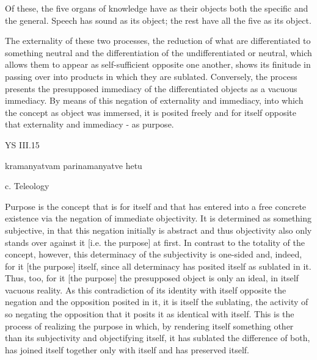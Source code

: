 Of these, the five organs of knowledge have as their objects
both the specific and the general.
Speech has sound as its object;
the rest have all the five as its object.

The externality of these two processes,
the reduction of what are differentiated to something neutral and
the differentiation of the undifferentiated or neutral,
which allows them to appear as self-sufficient opposite one another,
shows its finitude in passing over into products in which they are sublated.
Conversely, the process presents the presupposed immediacy
of the differentiated objects as a vacuous immediacy.
By means of this negation of externality and immediacy,
into which the concept as object was immersed,
it is posited freely and for itself opposite
that externality and immediacy - as purpose.

YS III.15

kramanyatvam parinamanyatve hetu

c. Teleology

Purpose is the concept that is for itself and that has entered into
a free concrete existence via the negation of immediate objectivity.
It is determined as something subjective, in that this negation
initially is abstract and thus objectivity also only stands
over against it [i.e. the purpose] at first.
In contrast to the totality of the concept, however,
this determinacy of the subjectivity is one-sided and, indeed,
for it [the purpose] itself, since all determinacy has posited
itself as sublated in it.
Thus, too, for it [the purpose] the presupposed object is
only an ideal, in itself vacuous reality.
As this contradiction of its identity with itself opposite the negation and the
opposition posited in it, it is itself the sublating, the activity of so negating
the opposition that it posits it as identical with itself.
This is the process of realizing the purpose in which,
by rendering itself something other than its subjectivity and
objectifying itself, it has sublated the difference of both,
has joined itself together only with itself and has preserved itself.

